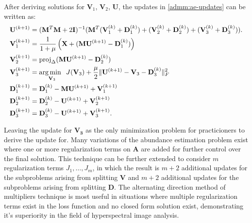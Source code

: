 After deriving solutions for $\mathbf{V}_1$, $\mathbf{V}_2$, $\mathbf{U}$, the updates in \eqref{admm:ae-updates} can be written as:
\begin{equation}
  \label{admm:ae-updates-final-2}
  \begin{aligned}
    \mathbf{U}^{(k+1)} & = (\mathbf{M}^T \mathbf{M} + 2\mathbf{I})^{-1}(\mathbf{M}^T(\mathbf{V}_1^{(k)}+\mathbf{D}_1^{(k)}) + (\mathbf{V}_2^{(k)}+\mathbf{D}_2^{(k)}) + (\mathbf{V}_3^{(k)}+\mathbf{D}_3^{(k)})).
    \\
    \mathbf{V}_1^{(k+1)} &= \frac{1}{1+\mu} \left(\mathbf{X} + (\mathbf{MU}^{(k+1)} - \mathbf{D}_1^{(k)})\right) 
    \\
    \mathbf{V}_2^{(k+1)} &= \text{proj}_\Delta(\mathbf{MU}^{(k+1)} - \mathbf{D}_2^{(k)}) 
    \\
    \mathbf{V}_3^{(k+1)} &= \operatorname*{arg\,min \;\;}_{\mathbf{V}_3} J(\mathbf{V}_3) + \frac{\mu}{2} \|\mathbf{U}^{(k+1)} - \mathbf{V}_3 - \mathbf{D}_3^{(k)}\|_F^2 
    \\
    \mathbf{D}_1^{(k+1)} &= \mathbf{D}_1^{(k)} - \mathbf{MU}^{(k+1)} + \mathbf{V}_1^{(k+1)} 
    \\
    \mathbf{D}_2^{(k+1)} &= \mathbf{D}_2^{(k)} - \mathbf{U}^{(k+1)} + \mathbf{V}_2^{(k+1)} 
    \\
    \mathbf{D}_3^{(k+1)} &= \mathbf{D}_3^{(k)} - \mathbf{U}^{(k+1)} + \mathbf{V}_3^{(k+1)}.
  \end{aligned}
\end{equation}

Leaving the update for $\mathbf{V_3}$ as the only minimization problem for practicioners to derive the update for. Many variations of the abundance estimation problem exist where one or more regularization terms on $\mathbf{A}$ are added for further control over the final solution. This technique can be further extended to consider $m$ regularization terms $J_1, \dots, J_m$, in which the result is $m+2$ additional updates for the subproblems arising from splitting $\mathbf{V}$ and $m+2$ additional updates for the subproblems arising from splitting $\mathbf{D}$. The alternating direction method of multipliers technique is most useful in situations where multiple regularization terms exist in the loss function and no closed form solution exist, demonstrating it's superiority in the field of hyperspectral image analysis.